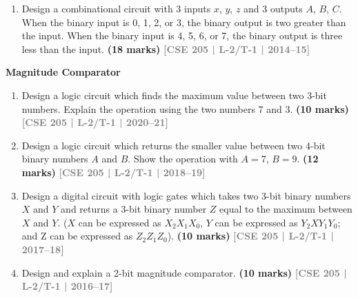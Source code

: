 \documentclass[12pt,a3paper]{article}
\newcommand{\yr}[1]{\hfill\textcolor{gray}{\small\textbf{[#1]}}}
\newcommand{\mk}[1]{\textcolor{orange!70!black}{\small\textbf{(#1 marks)}}}
\newcommand{\subtopic}[2]{%
  \vspace{10pt}
  \noindent\begin{tcolorbox}[colback=#1!8,colframe=#1,boxrule=0.6pt,arc=4pt,
    left=6pt,right=6pt,top=4pt,bottom=4pt]
    \small\bfseries\textcolor{#1}{#2}
  \end{tcolorbox}
  \vspace{2pt}
}
\begin{document}
\begin{enumerate}
\begin{center}
\end{center}

\mk{8} \yr{CSE 205 | L-2/T-1 | 2016--17}

\item Design a combinational circuit with 3 inputs $x$, $y$, $z$ and 3 outputs $A$, $B$, $C$. When the binary input is 0, 1, 2, or 3, the binary output is two greater than the input. When the binary input is 4, 5, 6, or 7, the binary output is three less than the input.
\mk{18} \yr{CSE 205 | L-2/T-1 | 2014--15}


\end{enumerate}

\subtopic{cD}{Magnitude Comparator}
\label{sub:s4-comparator}

\begin{enumerate}

\item Design a logic circuit which finds the maximum value between two 3-bit numbers. Explain the operation using the two numbers 7 and 3.
\mk{10} \yr{CSE 205 | L-2/T-1 | 2020--21}

\item Design a logic circuit which returns the smaller value between two 4-bit binary numbers $A$ and $B$. Show the operation with $A=7$, $B=9$.
\mk{12} \yr{CSE 205 | L-2/T-1 | 2018--19}

\item Design a digital circuit with logic gates which takes two 3-bit binary numbers $X$ and $Y$ and returns a 3-bit binary number $Z$ equal to the maximum between $X$ and $Y$. 
($X$ can be expressed as $X_2X_1X_0$, $Y$ can be expressed as $Y_2XY_1Y_0$; and Z can be
expressed as $Z_2Z_1Z_0$).
\mk{10} \yr{CSE 205 | L-2/T-1 | 2017--18}

\item Design and explain a 2-bit magnitude comparator.
\mk{10} \yr{CSE 205 | L-2/T-1 | 2016--17}

\end{enumerate}
\end{document}
